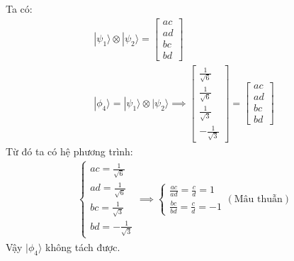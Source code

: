 Ta có:
\begin{align*}
    |\psi_1\rangle \otimes |\psi_2\rangle = \begin{bmatrix}
                                                ac \\
                                                ad \\
                                                bc \\
                                                bd
                                            \end{bmatrix} \\
    |\phi_{4}\rangle=|\psi_1\rangle \otimes |\psi_2\rangle
    \implies \begin{bmatrix}
                 \frac{1}{\sqrt{6}} \\
                 \frac{1}{\sqrt{6}} \\
                 \frac{1}{\sqrt{3}} \\
                 -\frac{1}{\sqrt{3}}
             \end{bmatrix} = \begin{bmatrix}
                                 ac \\
                                 ad \\
                                 bc \\
                                 bd
                             \end{bmatrix}
\end{align*}
Từ đó ta có hệ phương trình:
\begin{align*}
    \begin{cases}
        ac = \frac{1}{\sqrt{6}} \\
        ad = \frac{1}{\sqrt{6}} \\
        bc = \frac{1}{\sqrt{3}} \\
        bd = -\frac{1}{\sqrt{3}}
    \end{cases}
    \implies
    \begin{cases}
        \frac{ac}{ad} = \frac{c}{d} = 1 \\
        \frac{bc}{bd} = \frac{c}{d} = -1
    \end{cases}
    (\text{Mâu thuẫn})
\end{align*}
Vậy $|\phi_{4}\rangle$ không tách được.

